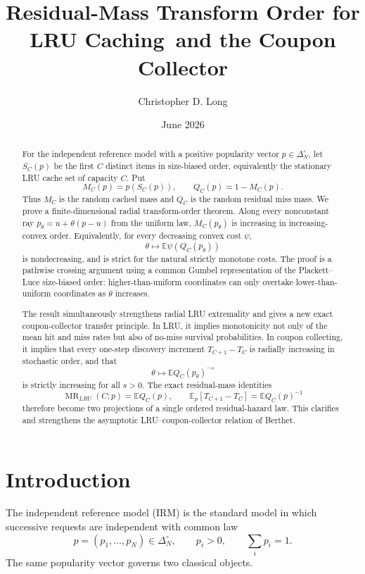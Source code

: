 \documentclass[11pt]{article}
\title{Residual-Mass Transform Order for LRU Caching\ and the Coupon Collector}
\author{Christopher D. Long}
\date{June 2026}
\newcommand{\E}{\mathbb E}
\newcommand{\1}{\mathbf 1}
\newcommand{\MR}{\operatorname{MR}}
\begin{document}
\maketitle

\begin{abstract}
For the independent reference model with a positive popularity vector
$p\in\Delta_N^\circ$, let $S_C(p)$ be the first $C$ distinct items in size-biased order,
equivalently the stationary LRU cache set of capacity $C$.  Put
\[
        M_C(p)=p(S_C(p)),\qquad Q_C(p)=1-M_C(p).
\]
Thus $M_C$ is the random cached mass and $Q_C$ is the random residual miss mass.
We prove a finite-dimensional radial transform-order theorem.  Along every nonconstant
ray $p_\theta=u+\theta(p-u)$ from the uniform law, $M_C(p_\theta)$ is increasing in
increasing-convex order.  Equivalently, for every decreasing convex cost $\psi$,
\[
        \theta\mapsto \E\psi(Q_C(p_\theta))
\]
is nondecreasing, and is strict for the natural strictly monotone costs.  The proof is a
pathwise crossing argument using a common Gumbel representation of the Plackett--Luce
size-biased order: higher-than-uniform coordinates can only overtake lower-than-uniform
coordinates as $\theta$ increases.

The result simultaneously strengthens radial LRU extremality and gives a new exact
coupon-collector transfer principle.  In LRU, it implies monotonicity not only of the
mean hit and miss rates but also of no-miss survival probabilities.  In coupon collecting,
it implies that every one-step discovery increment $T_{C+1}-T_C$ is radially increasing
in stochastic order, and that
\[
        \theta\mapsto \E Q_C(p_\theta)^{-s}
\]
is strictly increasing for all $s>0$.  The exact residual-mass identities
\[
        \MR_{LRU}(C;p)=\E Q_C(p),
        \qquad
        \E_p[T_{C+1}-T_C]=\E Q_C(p)^{-1}
\]
therefore become two projections of a single ordered residual-hazard law.  This clarifies
and strengthens the asymptotic LRU--coupon-collector relation of Berthet.
\end{abstract}

\tableofcontents

\section{Introduction}

The independent reference model (IRM) is the standard model in which successive requests
are independent with common law
\[
        p=(p_1,\ldots,p_N)\in\Delta_N^\circ,
        \qquad
        p_i>0,
        \qquad
        \sum_i p_i=1.
\]
The same popularity vector governs two classical objects.
\end{document}
